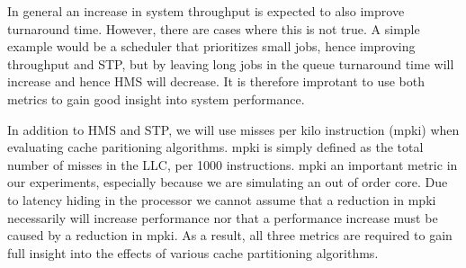 In general an increase in system throughput is expected to also improve turnaround time.
However, there are cases where this is not true.
A simple example would be a scheduler that prioritizes small jobs, hence improving throughput and STP, but by leaving long jobs in the queue turnaround time will increase and hence HMS will decrease.
It is therefore improtant to use both metrics to gain good insight into system performance.

In addition to HMS and STP, we will use misses per kilo instruction (mpki) when evaluating cache paritioning algorithms.
mpki is simply defined as the total number of misses in the LLC, per 1000 instructions.
mpki an important metric in our experiments, especially because we are simulating an out of order core. 
Due to latency hiding in the processor we cannot assume that a reduction in mpki necessarily will increase performance nor that a performance increase must be caused by a reduction in mpki.
As a result, all three metrics are required to gain full insight into the effects of various cache partitioning algorithms.